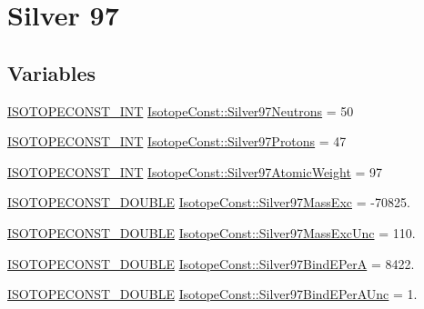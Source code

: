\hypertarget{group___isotope_const-_silver-_ag97}{}\section{Silver 97}
\label{group___isotope_const-_silver-_ag97}
\subsection*{Variables}
\begin{DoxyCompactItemize}
\item 
\mbox{\hyperlink{group___isotope_const-_macros_ga5f18360b3e99483a35c32d789e62621c}{I\+S\+O\+T\+O\+P\+E\+C\+O\+N\+S\+T\+\_\+\+I\+NT}} \mbox{\hyperlink{group___isotope_const-_silver-_ag97_ga6397f81baf4168285225cc718ce626a8}{Isotope\+Const\+::\+Silver97\+Neutrons}} = 50
\item 
\mbox{\hyperlink{group___isotope_const-_macros_ga5f18360b3e99483a35c32d789e62621c}{I\+S\+O\+T\+O\+P\+E\+C\+O\+N\+S\+T\+\_\+\+I\+NT}} \mbox{\hyperlink{group___isotope_const-_silver-_ag97_ga236c842b71eb5df2209fead4f5dd38bc}{Isotope\+Const\+::\+Silver97\+Protons}} = 47
\item 
\mbox{\hyperlink{group___isotope_const-_macros_ga5f18360b3e99483a35c32d789e62621c}{I\+S\+O\+T\+O\+P\+E\+C\+O\+N\+S\+T\+\_\+\+I\+NT}} \mbox{\hyperlink{group___isotope_const-_silver-_ag97_ga7efb7c9cbfea5220f7ab8aba73f822be}{Isotope\+Const\+::\+Silver97\+Atomic\+Weight}} = 97
\item 
\mbox{\hyperlink{group___isotope_const-_macros_ga8f45a7272ce02c0b4c65c44636ed719a}{I\+S\+O\+T\+O\+P\+E\+C\+O\+N\+S\+T\+\_\+\+D\+O\+U\+B\+LE}} \mbox{\hyperlink{group___isotope_const-_silver-_ag97_ga6b5e5a5da33a8427dd6a5a8e93cabce6}{Isotope\+Const\+::\+Silver97\+Mass\+Exc}} = -\/70825.
\item 
\mbox{\hyperlink{group___isotope_const-_macros_ga8f45a7272ce02c0b4c65c44636ed719a}{I\+S\+O\+T\+O\+P\+E\+C\+O\+N\+S\+T\+\_\+\+D\+O\+U\+B\+LE}} \mbox{\hyperlink{group___isotope_const-_silver-_ag97_ga0194a969f2e0c95671b9bf14a9b91b2d}{Isotope\+Const\+::\+Silver97\+Mass\+Exc\+Unc}} = 110.
\item 
\mbox{\hyperlink{group___isotope_const-_macros_ga8f45a7272ce02c0b4c65c44636ed719a}{I\+S\+O\+T\+O\+P\+E\+C\+O\+N\+S\+T\+\_\+\+D\+O\+U\+B\+LE}} \mbox{\hyperlink{group___isotope_const-_silver-_ag97_ga761c3769db3aa647aae255f971422375}{Isotope\+Const\+::\+Silver97\+Bind\+E\+PerA}} = 8422.
\item 
\mbox{\hyperlink{group___isotope_const-_macros_ga8f45a7272ce02c0b4c65c44636ed719a}{I\+S\+O\+T\+O\+P\+E\+C\+O\+N\+S\+T\+\_\+\+D\+O\+U\+B\+LE}} \mbox{\hyperlink{group___isotope_const-_silver-_ag97_gaddfe0c7838d84f7be9f44aabfd993d69}{Isotope\+Const\+::\+Silver97\+Bind\+E\+Per\+A\+Unc}} = 1.

\end{DoxyCompactItemize}

